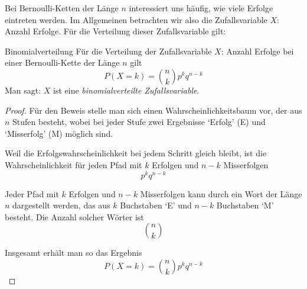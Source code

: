 Bei Bernoulli-Ketten der Länge \(n\) interessiert uns häufig, wie viele Erfolge eintreten werden. Im Allgemeinen betrachten wir also die Zufallsvariable \(X\): Anzahl Erfolge. Für die Verteilung dieser Zufallsvariable gilt:
\begin{satz}
    {Binomialverteilung}{}
    Für die Verteilung der Zufallsvariable \( X \): Anzahl Erfolge bei einer Bernoulli-Kette der Länge \( n \) gilt
    \[
        P(X = k) = \binom{n}{k} p^k q^{n-k}
    \]
    Man sagt: \( X \) ist eine \textit{binomialverteilte Zufallsvariable}.

\end{satz}
\begin{proof}
    Für den Beweis stelle man sich einen Wahrscheinlichkeitsbaum vor, der aus \(n\) Stufen besteht, wobei bei jeder Stufe zwei Ergebnisse `Erfolg' (E) und `Misserfolg' (M) möglich sind.

    Weil die Erfolgswahrscheinlichkeit bei jedem Schritt gleich bleibt, ist die Wahrscheinlichkeit für jeden Pfad mit \(k\) Erfolgen und \(n-k\) Misserfolgen
    \[ p^k q^{n-k}\]

    Jeder Pfad mit \(k\) Erfolgen und \(n-k\) Misserfolgen kann durch ein Wort der Länge \(n\) dargestellt werden, das aus \(k\) Buchstaben `E' und \(n-k\) Buchstaben `M' besteht. Die Anzahl solcher Wörter ist
    \[ \binom{n}{k}\]

    Insgesamt erhält man so das Ergebnis
    \[
        P(X = k) = \binom{n}{k} p^k q^{n-k}
    \]
\end{proof}

